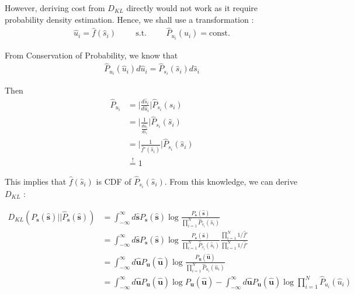 However, deriving cost from $D_{KL}$ directly would not work as it require probability density estimation. Hence, we shall use a transformation :
\begin{align*}
	\hat{u}_i = \hat{f}( \hat{s}_i ) \hspace{1cm} \text{s.t.} \hspace{1cm}  \hat{P}_{u_i}(\hat{u}_i) = \text{const.}
\end{align*}

From Conservation of Probability, we know that 
\begin{align*}
	\hat{P}_{u_i}(\hat{u}_i) d\hat{u}_i =\hat{P}_{s_i}(\hat{s}_i) d\hat{s}_i
\end{align*}

Then
\begin{align*}
	\hat{P}_{u_i} &= \Bigg |  \frac{d\hat{s}_i}{d\hat{u}_i} \Bigg | \hat{P}_{s_i}(\hat{s}_i)  \\
	&= \Bigg |  \frac{1}{\frac{d\hat{u}_i}{d\hat{s}_i}} \Bigg | \hat{P}_{s_i}(\hat{s}_i) \\
	&= \Bigg |  \frac{1}{ \hat{f}'( \hat{s}_i )  } \Bigg | \hat{P}_{s_i}(\hat{s}_i) \\
	&\stackrel{!}{=}1
\end{align*}

This implies that $\hat{f}({\hat{s}_i})$ is CDF of $\hat{P}_{s_i}(\hat{s}_i)$. From this knowledge, we can derive $D_{KL}$ :

\begin{align*}
	 D_{KL} ( P_{\boldsymbol{s}}(\boldsymbol{\hat{s}}) || \hat{P}_{\boldsymbol{s}}(\boldsymbol{\hat{s}}) ) &= \int_{-\infty}^{\infty} d\boldsymbol{\hat{s}} P_{\boldsymbol{s}} (\boldsymbol{\hat{s}}) \log \frac{ P_{\boldsymbol{s}}(\boldsymbol{\hat{s}}) }{
	 	\prod_{i=1}^{N} \hat{P}_{s_i}(\hat{s}_i)
	 	}  \\
	 	&= \int_{-\infty}^{\infty} d\boldsymbol{\hat{s}} P_{\boldsymbol{s}} (\boldsymbol{\hat{s}}) \log \frac{ P_{\boldsymbol{s}}(\boldsymbol{\hat{s}}) }{
	 	\prod_{i=1}^{N} \hat{P}_{s_i}(\hat{s}_i)
	 	}  \frac{ \prod_{i=1}^{N} 1/\hat{f}' }{ \prod_{i=1}^{N} 1/\hat{f}'  } \\
	 	&= \int_{-\infty}^{\infty} d\boldsymbol{\hat{u}} P_{\boldsymbol{u}} (\boldsymbol{\hat{u}}) \log \frac{ P_{\boldsymbol{u}}(\boldsymbol{\hat{u}}) }{
	 	\prod_{i=1}^{N} \hat{P}_{u_i}(\hat{u}_i)
	 	}  \\
	 	&= \int_{-\infty}^{\infty} d\boldsymbol{\hat{u}} P_{\boldsymbol{u}} (\boldsymbol{\hat{u}}) \log  P_{\boldsymbol{u}}(\boldsymbol{\hat{u}}) 
	 	- 	 	
	 	\int_{-\infty}^{\infty} d\boldsymbol{\hat{u}} P_{\boldsymbol{u}} (\boldsymbol{\hat{u}})
	 	\log \prod_{i=1}^{N} \hat{P}_{u_i}(\hat{u}_i)
	 	  \\
\end{align*}

